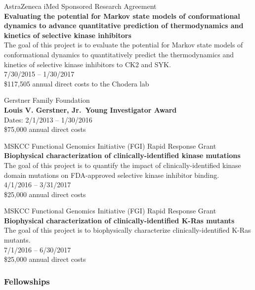 \documentclass[10pt]{article}
\begin{document}
\vspace{1.5ex}

AstraZeneca iMed Sponsored Research Agreement \\
{\bf Evaluating the potential for Markov state models of conformational dynamics to advance quantitative prediction of thermodynamics and kinetics of selective kinase inhibitors} \\
The goal of this project is to evaluate the potential for Markov state models of conformational dynamics to quantitatively predict the thermodynamics and kinetics of selective kinase inhibitors to CK2 and SYK. \\
7/30/2015 -- 1/30/2017 \\
\$117,505 annual direct costs to the Chodera lab

\vspace{1.5ex}

Gerstner Family Foundation \\
{\bf Louis V. Gerstner, Jr.~Young Investigator Award} \\
Dates: 2/1/2013 -- 1/30/2016 \\
\$75,000 annual direct costs

\vspace{1.5ex}

MSKCC Functional Genomics Initiative (FGI) Rapid Response Grant \\
{\bf Biophysical characterization of clinically-identified kinase mutations} \\
The goal of this project is to quantify the impact of clinically-identified kinase domain mutations on FDA-approved selective kinase inhibitor binding. \\
4/1/2016 -- 3/31/2017 \\
\$25,000 annual direct costs

\vspace{1.5ex}

MSKCC Functional Genomics Initiative (FGI) Rapid Response Grant \\
{\bf Biophysical characterization of clinically-identified K-Ras mutants} \\
The goal of this project is to biophysically characterize clinically-identified K-Ras mutants. \\
7/1/2016 -- 6/30/2017 \\
\$25,000 annual direct costs

\subsubsection*{Fellowships}
\end{document}
